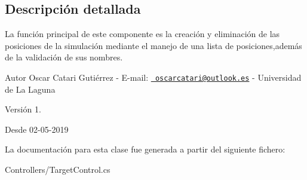 \subsection{Descripción detallada}
La función principal de este componente es la creación y eliminación de las posiciones de la simulación mediante el manejo de una lista de posiciones,además de la validación de sus nombres. \begin{DoxyAuthor}{Autor}
Oscar Catari Gutiérrez -\/ E-\/mail\+: \href{mailto:oscarcatari@outlook.es}{\texttt{ oscarcatari@outlook.\+es}} -\/ Universidad de La Laguna 
\end{DoxyAuthor}
\begin{DoxyVersion}{Versión}
1. 
\end{DoxyVersion}
\begin{DoxySince}{Desde}
02-\/05-\/2019 
\end{DoxySince}


La documentación para esta clase fue generada a partir del siguiente fichero\+:\begin{DoxyCompactItemize}
\item 
Controllers/Target\+Control.\+cs\end{DoxyCompactItemize}
